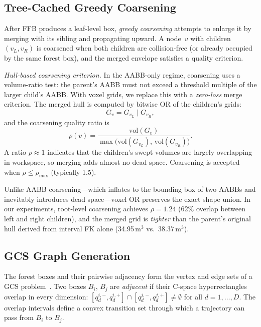 \documentclass[journal]{IEEEtran}
\begin{document}
\subsection{Tree-Cached Greedy Coarsening}\label{sec:coarsen}

After FFB produces a leaf-level box, \emph{greedy coarsening}
attempts to enlarge it by merging with its sibling and
propagating upward.
A node~$v$ with children~$(v_L, v_R)$ is coarsened when
both children are collision-free (or already occupied by the
same forest box), and the merged envelope satisfies a quality
criterion.

\emph{Hull-based coarsening criterion.}
In the AABB-only regime, coarsening uses a volume-ratio test:
the parent's AABB must not exceed a threshold multiple of the
larger child's AABB.
With voxel grids, we replace this with a \emph{zero-loss}
merge criterion.
The merged hull is computed by bitwise OR of the children's grids:
\begin{equation}\label{eq:coarsen_merge}
  G_{v} = G_{v_L} \mathbin{|} G_{v_R},
\end{equation}
and the coarsening quality ratio is
\begin{equation}\label{eq:coarsen_ratio}
  \rho(v) = \frac{\mathrm{vol}(G_v)}{\max\bigl(\mathrm{vol}(G_{v_L}),\, \mathrm{vol}(G_{v_R})\bigr)}.
\end{equation}
A ratio $\rho \approx 1$ indicates that the children's
swept volumes are largely overlapping in workspace, so merging
adds almost no dead space.
Coarsening is accepted when $\rho \leq \rho_\text{max}$
(typically 1.5).

Unlike AABB coarsening---which inflates to the bounding box
of two AABBs and inevitably introduces dead space---voxel
OR preserves the exact shape union.
In our experiments, root-level coarsening achieves
$\rho{=}1.24$ (62\% overlap between left and right children),
and the merged grid is \emph{tighter} than the parent's
original hull derived from interval FK alone
(34.95\,m$^3$ vs.\ 38.37\,m$^3$).

\subsection{GCS Graph Generation}\label{sec:gcs_graph}

The forest boxes and their pairwise adjacency form the vertex
and edge sets of a GCS problem~\cite{marcucci2024motion}.
Two boxes $B_i$, $B_j$ are \emph{adjacent} if their C-space
hyperrectangles overlap in every dimension:
$[q_d^{i,-}, q_d^{i,+}] \cap [q_d^{j,-}, q_d^{j,+}] \neq \emptyset$
for all $d = 1,\ldots,D$.
The overlap intervals define a convex transition set through which
a trajectory can pass from $B_i$ to $B_j$.
\end{document}
